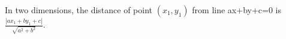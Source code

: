  In two dimensions, the distance of point $ (x_1 , y_1) $ from line
ax+by+c=0 is 
$ \frac{ | ax_1 + by_1 +c | }{\sqrt{a^2 + b^2 }} . $
